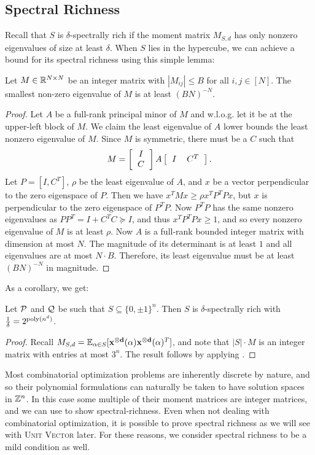 \subsection{Spectral Richness}
Recall that $S$ is $\delta$-spectrally rich if the moment matrix $M_{S,d}$ has only nonzero eigenvalues of size at least $\delta$. When $S$ lies in the hypercube, we can achieve a bound for its spectral richness using this simple lemma:
\begin{lemma} \label{lem:integer}
	Let $M \in \mathbb R^{N \times N}$ be an integer matrix with $|M_{ij}| \leq B$ for all $i,j \in [N]$.  The smallest non-zero eigenvalue of $M$ is at least 
	$(BN)^{-N}$.
\end{lemma}
\begin{proof}
Let $A$ be a full-rank principal minor of $M$ and w.l.o.g. let it be at the upper-left block of $M$. We claim the least eigenvalue of $A$ lower bounds the least nonzero eigenvalue of $M$.
%
Since $M$ is symmetric, there must be a $C$ such that
\[M = \left[\begin{tabular}{c} $I$ \\ $C$\end{tabular}\right]A\left[\begin{tabular}{cc} $I$ & $C^T$\end{tabular}\right].\]
Let $P = [I, C^T]$, $\rho$ be the least eigenvalue of $A$, and $x$ be a vector perpendicular to the zero eigenspace of $P$. Then we have $x^TMx \geq \rho x^TP^TPx$,
but $x$ is perpendicular to the zero eigenspace of $P^TP$. Now $P^TP$ has the same nonzero eigenvalues as $PP^T = I + C^TC \succeq I$, and thus $x^TP^TPx \geq 1$, and so every nonzero eigenvalue of $M$ is at least $\rho$. Now $A$ is a full-rank bounded integer matrix with dimension at most $N$. The magnitude of its determinant is at least $1$ and all eigenvalues are at most $N \cdot B$.  Therefore, its least eigenvalue must be at least $(BN)^{-N}$ in magnitude. 
\end{proof}
As a corollary, we get:
\begin{corollary}\label{cor:integer-rich}
Let $\mathcal P$ and $\mathcal Q$ be such that $S \subseteq \{0,\pm 1\}^n$. Then $S$ is $\delta$-spectrally rich with $\frac{1}{\delta} = 2^{\operatorname{poly}(n^d)}$.
\end{corollary}
\begin{proof}
	Recall $M_{S,d} = \operatorname*{\mathbb{E}}_{\alpha \in S}[\mathbf{x^{\otimes d}}(\alpha)\mathbf{x^{\otimes d}}(\alpha)^T]$, and note that $|S| \cdot M$ is an integer matrix with entries at most $3^n$.  The result follows by applying . 
\end{proof}
Most combinatorial optimization problems are inherently discrete by nature, and so their polynomial formulations can naturally be taken to have solution spaces in $\mathbb Z^n$. In this case some multiple of their moment matrices are integer matrices, and we can use  to show spectral-richness. Even when not dealing with combinatorial optimization, it is possible to prove spectral richness as we will see with \textsc{Unit Vector} later. For these reasons, we consider spectral richness to be a mild condition as well.

